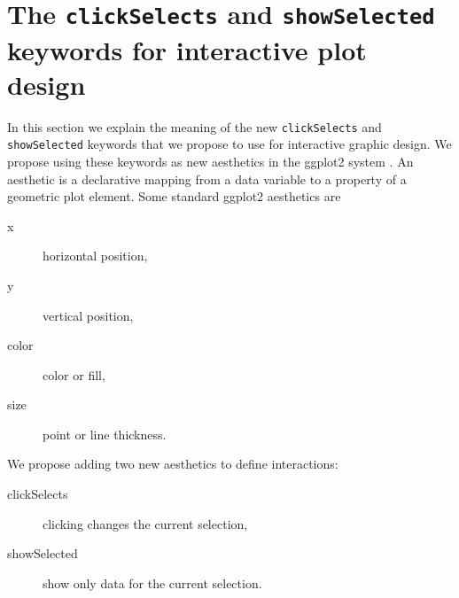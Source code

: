 \documentclass[12pt]{article}\usepackage[]{graphicx}\usepackage[]{color}
\begin{document}
\section{The \texttt{clickSelects} and \texttt{showSelected} keywords for interactive
  plot design}
\label{sec:design}




In this section we explain the meaning of the new
\texttt{clickSelects} and \texttt{showSelected} keywords that we
propose to use for interactive graphic design. We
propose using these keywords as new aesthetics in the ggplot2 system
\citep{ggplot2-book}. An aesthetic is a declarative mapping from a
data variable to a property of a geometric plot element. Some standard
ggplot2 aesthetics are
\begin{description}
\item[x] horizontal position,
\item[y] vertical position,
\item[color] color or fill,
\item[size] point or line thickness.
\end{description}
We propose adding two new aesthetics to define interactions:
\begin{description}
\item[clickSelects] clicking changes the current selection,
\item[showSelected] show only data for the current selection.
\end{description}
\end{document}
